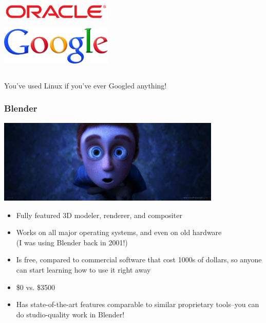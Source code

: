 \documentclass{beamer}
\begin{document}
\begin{frame}
\begin{columns}
\begin{center}
      \includegraphics[width=0.4\textwidth]{../img/oracle}

      \includegraphics[width=0.4\textwidth]{../img/google}
    \end{center}
  \end{columns}
  \begin{center}
    You've used Linux if you've ever Googled anything!
  \end{center}

\end{frame}

\begin{frame}
  \frametitle{Blender}
  \begin{center} \includegraphics[width=0.8\textwidth]{../img/blenderex} \end{center}
  \begin{itemize}
  \item Fully featured 3D modeler, renderer, and compositer
  \item Works on all major operating systems, and even on old hardware
    \\ (I was using Blender back in 2001!)
  \item Is free, compared to commercial software that cost 1000s of
    dollars, so anyone can start learning how to use it right away
  \item \$0 vs. \$3500
  \item Has state-of-the-art features comparable to similar
    proprietary tools--you can do studio-quality work in Blender!
  \end{itemize}
\end{frame}
\end{document}
